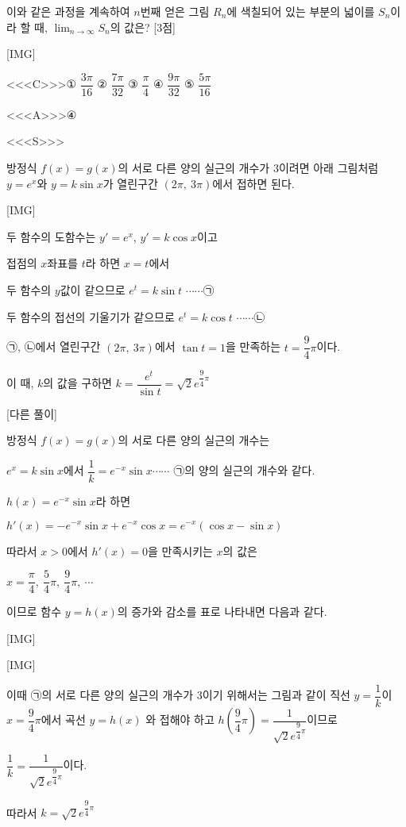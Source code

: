 \documentclass{oblivoir}
\begin{document}
이와 같은 과정을 계속하여 $n$번째 얻은 그림 $R_{n}$에 색칠되어 있는 부분의 넓이를 $S_{n}$이라 할 때, $\displaystyle\lim_{n\to \infty}S_{n}$의 값은? [3점]

[IMG]

<<<C>>>① $\dfrac{3\pi}{16}$ ② $\dfrac{7\pi}{32}$ ③ $\dfrac{\pi}{4}$ ④ $\dfrac{9\pi}{32}$ ⑤ $\dfrac{5\pi}{16}$

<<<A>>>④

<<<S>>>

방정식 $f(x)=g(x)$의 서로 다른 양의 실근의 개수가 $3$이려면 아래 그림처럼 $y=e^{x}$와 $y=k\sin x$가 열린구간 $(2\pi ,\: 3\pi)$에서 접하면 된다.

[IMG]

두 함수의 도함수는 $y'=e^{x}$, $y'= k\cos x$이고

접점의 $x$좌표를 $t$라 하면 $x=t$에서

두 함수의 $y$값이 같으므로 $e^{t}=k\sin t$ $\cdots\cdots$㉠

두 함수의 접선의 기울기가 같으므로 $e^{t}=k\cos t$ $\cdots\cdots$㉡

㉠, ㉡에서 열린구간 $(2\pi ,\: 3\pi)$에서 $\tan t=1$을 만족하는 $t =\dfrac{9}{4}\pi$이다.

이 때, $k$의 값을 구하면 $k=\dfrac{e^{t}}{\sin t}=\sqrt{2}e^{\dfrac{9}{4}\pi}$

[다른 풀이]

방정식 $f(x)=g(x)$의 서로 다른 양의 실근의 개수는

$e^{x}= k\sin x$에서 $\dfrac{1}{k}=e^{-x}\sin x$$\cdots\cdots$ ㉠의 양의 실근의 개수와 같다.  

$h(x)=e^{-x}\sin x$라 하면

$h'(x)=-e^{-x}\sin x +e^{-x}\cos x =e^{-x}(\cos x -\sin x)$

따라서 $x>0$에서 $h'(x)=0$을 만족시키는 $x$의 값은

$x=\dfrac{\pi}{4},\:\dfrac{5}{4}\pi ,\:\dfrac{9}{4}\pi ,\:\cdots$

이므로 함수 $y=h(x)$의 증가와 감소를 표로 나타내면 다음과 같다.

[IMG]

[IMG]

이때 ㉠의 서로 다른 양의 실근의 개수가 $3$이기 위해서는 그림과 같이 직선 $y=\dfrac{1}{k}$이 $x=\dfrac{9}{4}\pi$에서 곡선 $y=h(x)$ 와 접해야 하고 $h\left(\dfrac{9}{4}\pi\right)=\dfrac{1}{\sqrt{2}e^{\dfrac{9}{4}\pi}}$이므로

$\dfrac{1}{k}=\dfrac{1}{\sqrt{2}e^{\dfrac{9}{4}\pi}}$이다.

따라서 $k=\sqrt{2}e^{\dfrac{9}{4}\pi}$
\end{document}
